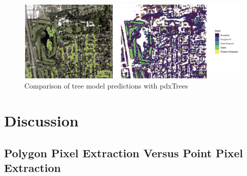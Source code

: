 \documentclass[12pt,twoside]{reedthesis}
\begin{document}
\begin{figure}

{\centering \includegraphics[width=1\linewidth]{figure/reedTreesTopdx} 

}

\caption{Comparison of tree model predictions with pdxTrees}\label{fig:reedTreesTopdx}
\end{figure}
\hypertarget{discussion}{%
\chapter{Discussion}\label{discussion}}

\hypertarget{polygon-pixel-extraction-versus-point-pixel-extraction}{%
\section{Polygon Pixel Extraction Versus Point Pixel Extraction}\label{polygon-pixel-extraction-versus-point-pixel-extraction}}
\end{document}

